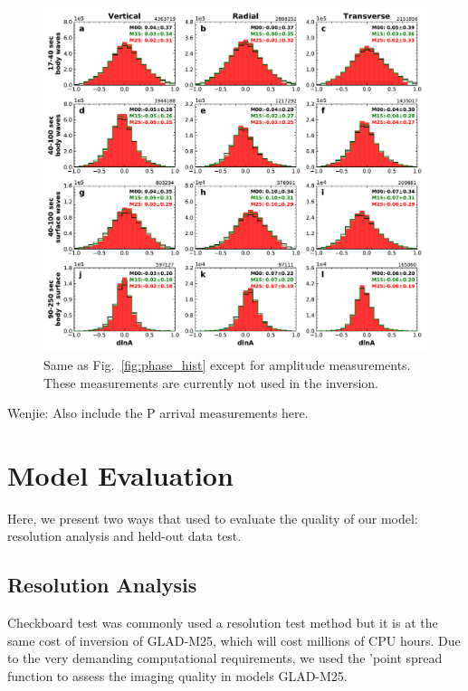 \documentclass[extra,mreferee]{gji}
\begin{document}
\begin{figure}
  \centering
  \includegraphics[width=\textwidth]{figures/dlna_histogram.pdf}
  \caption{Same as Fig.~\ref{fig:phase_hist} except for amplitude measurements. These measurements are currently not used in the inversion.}
  \label{fig:amp_hist}
\end{figure}

{\color{red} Wenjie: Also include the P arrival measurements here.}

\section{Model Evaluation}

Here, we present two ways that used to evaluate the quality of our model:
resolution analysis and held-out data test.

\subsection{Resolution Analysis}
Checkboard test was commonly used a resolution test method but it is at the
same cost of inversion of GLAD-M25, which will cost millions of CPU hours.
Due to the very demanding computational requirements, we used the 'point
spread function to assess the imaging quality in models GLAD-M25.
\end{document}
